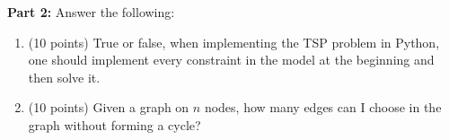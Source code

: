 \documentclass[letterpaper,oneside,12pt]{article}%
\begin{document}
\textbf{Part 2:} Answer the following:

\begin{enumerate}[resume]
\item (10 points) True or false, when implementing the TSP problem in Python, one should implement every constraint in the model at the beginning and then solve it. \vspace{1in}
\item (10 points) Given a graph on $n$ nodes, how many edges can I choose in the graph without forming a cycle? \vspace{1in}
\end{enumerate}
\end{document}
